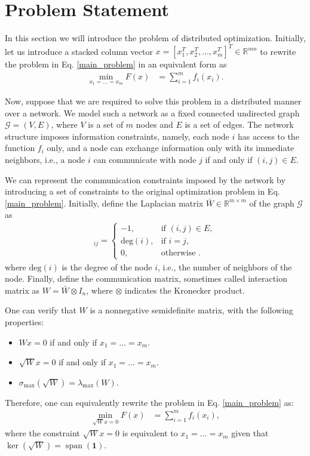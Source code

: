 \documentclass[final]{siamart1116}
\DeclareMathOperator{\spn}{span}
\numberwithin{theorem}{section}
\begin{document}
	
	\section{Problem Statement}\label{sec:problem}
	
	In this section we will introduce the problem of distributed optimization. Initially, let us introduce a stacked column vector ${{{x} = [x_1^T,x_2^T,\hdots,x_m^T]^T \in \mathbb{R}^{mn}}}$ to rewrite the problem in Eq. \eqref{main_problem} in an equivalent form as
	\begin{align*}
	\min_{x_1 = \hdots =x_m} {F(x)} & = \sum\limits_{i=1}^{m}f_i(x_i).
	\end{align*}
	
	Now, suppose that we are required to solve this problem in a distributed manner over a network. We model such a network as a fixed connected undirected graph $\mathcal{G} = (V,E)$, where $V$ is a set of {$m$} nodes and $E$ is a set of edges. The network structure imposes information constraints, namely, each node $i$ has access to the function $f_i$ only, {and a node can exchange information only with its immediate neighbors, i.e., a node $i$ can communicate with node $j$ if and only if $(i,j)\in E$}.
	
	We can represent the communication constraints imposed by the network by introducing a set of constraints to the original optimization problem in Eq.\cref{main_problem}. Initially, define the Laplacian matrix $\bar W{\in \mathbb{R}^{m\times m}}$ of the graph $\mathcal{G}$ as
	\begin{align*}
	[\bar W]_{ij} = \begin{cases}
	-1,  & \text{if } (i,j) \in E,\\
	\text{deg}(i), &\text{if } i= j, \\
	0,  & \text{otherwise }.
	\end{cases}
	\end{align*}
	where $\text{deg}(i)$ is the degree of the node $i$, i.e., the number of neighbors of the node. Finally, define the communication matrix, sometimes called interaction matrix as $W = \bar W \otimes I_n$, where $\otimes$ indicates the Kronecker product.
	
	One can verify that $W$ is a nonnegative semidefinite matrix, with the following properties:
	\begin{itemize}
		\item $W{x} = 0$ if and only if {$x_1 = \hdots = x_m$}.
		\item $\sqrt{W}{x} = 0$ if and only if {$x_1 = \hdots = x_m$}.
		\item $\sigma_{\max} (\sqrt{W}) = \lambda_{\max} (W)$.
	\end{itemize}
	Therefore, one can equivalently rewrite the problem in Eq. \eqref{main_problem} as:
	\begin{align}\label{consensus_problem2}
	\min_{\sqrt{W} x=0} {F(x)} & = \sum\limits_{i=1}^{m}f_i(x_i),
	\end{align}
	where the constraint $\sqrt{W} x=0$ is equivalent to \mbox{$x_1 = \hdots  = x_m$} given that $\ker (\sqrt{W}) = \spn(\boldsymbol{1})$.
	
\end{document}
